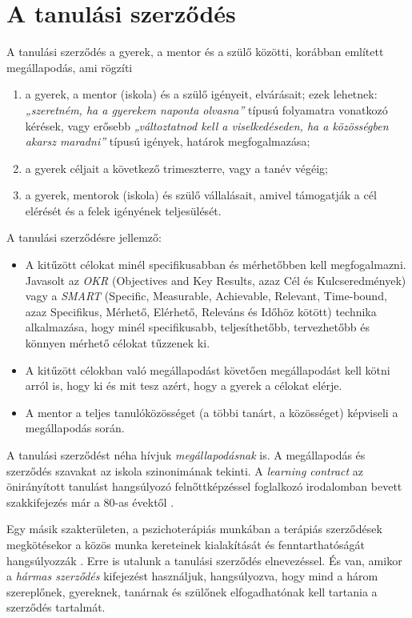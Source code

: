 \hypertarget{a-tanulasi-szerzodes}{%
\section{A tanulási szerződés}\label{a-tanulasi-szerzodes}}

A tanulási szerződés a gyerek, a mentor és a szülő közötti, korábban
említett megállapodás, ami rögzíti

\begin{enumerate}
\def\labelenumi{\arabic{enumi}.}
\tightlist
\item
  a gyerek, a mentor (iskola) és a szülő igényeit, elvárásait; ezek
  lehetnek: \emph{„szeretném, ha a gyerekem naponta olvasna''} típusú
  folyamatra vonatkozó kérések, vagy erősebb \emph{„változtatnod kell a
  viselkedéseden, ha a közösségben akarsz maradni''} típusú igények, határok
  megfogalmazása;
\item
  a gyerek céljait a következő trimeszterre, vagy a tanév végéig;
\item
  a gyerek, mentorok (iskola) és szülő vállalásait, amivel támogatják a
  cél elérését és a felek igényének teljesülését.
\end{enumerate}

A tanulási szerződésre jellemző:

\begin{itemize}
\tightlist
\item
  A kitűzött célokat minél specifikusabban és mérhetőbben kell
  megfogalmazni. Javasolt az
  {\emph{OKR}}
  (Objectives and Key
  Results, azaz Cél és Kulcseredmények) vagy a
  {\emph{SMART}} (Specific,
  Measurable, Achievable, Relevant, Time-bound, azaz Specifikus,
  Mérhető, Elérhető, Releváns és Időhöz kötött) technika alkalmazása,
  hogy minél specifikusabb, teljesíthetőbb, tervezhetőbb és könnyen
  mérhető célokat tűzzenek ki.
\item
  A kitűzött célokban való megállapodást követően megállapodást\break
  kell
  kötni arról is, hogy ki és mit tesz azért, hogy a gyerek a célokat
  elérje.
\item
  A mentor a teljes tanulóközösséget (a többi tanárt, a közösséget)
  képviseli a megállapodás során.
\end{itemize}

A tanulási szerződést néha hívjuk \emph{megállapodásnak} is. A
megállapodás és szerződés szavakat az iskola szinonimának tekinti. A
\emph{learning contract} az önirányított tanulást hangsúlyozó
felnőttképzéssel foglalkozó irodalomban bevett szakkifejezés már a 80-as
évektől {\autocite{Knowles1977}}.

Egy másik szakterületen, a pszichoterápiás munkában a terápiás
szerződések megkötésekor a közös munka kereteinek kialakítását és
fenntarthatóságát hangsúlyozzák {\autocite{Perczel2009}}. Erre is
utalunk a tanulási szerződés elnevezéssel. És van, amikor a \emph{hármas
szerződés} kifejezést használjuk, hangsúlyozva, hogy mind a három
szereplőnek, gyereknek, tanárnak és szülőnek elfogadhatónak kell
tartania a szerződés tartalmát.
